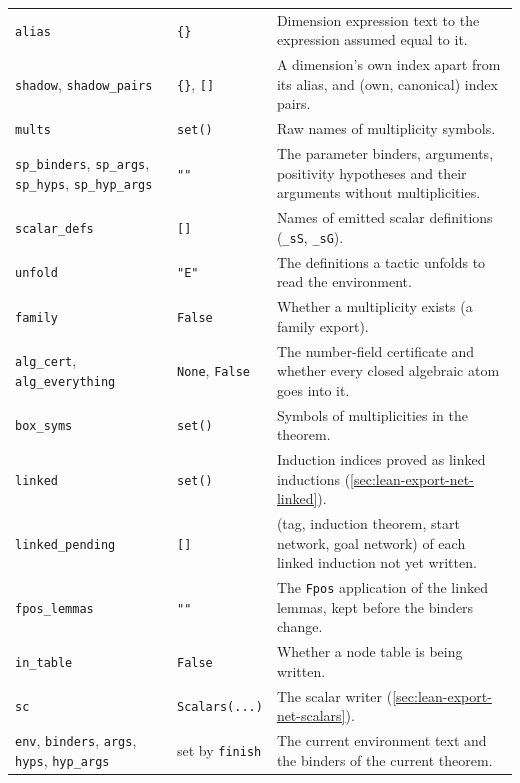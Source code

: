 {\begin{xltabular}{\linewidth}{@{}p{3.3cm}p{3.2cm}X@{}}
\texttt{alias} & \texttt{\{\}} & Dimension expression text to the expression assumed equal to it. \\
\texttt{shadow}, \texttt{shadow\_\allowbreak{}pairs} & \texttt{\{\}}, \texttt{[]} & A dimension's own index apart from its alias,
  and (own, canonical) index pairs. \\
\texttt{mults} & \texttt{set()} & Raw names of multiplicity symbols. \\
\texttt{sp\_\allowbreak{}binders}, \texttt{sp\_\allowbreak{}args}, \texttt{sp\_\allowbreak{}hyps}, \texttt{sp\_\allowbreak{}hyp\_\allowbreak{}args} & \texttt{""} & The parameter binders,
  arguments, positivity hypotheses and their arguments without multiplicities. \\
\texttt{scalar\_\allowbreak{}defs} & \texttt{[]} & Names of emitted scalar definitions (\texttt{\_\allowbreak{}sS}, \texttt{\_\allowbreak{}sG}). \\
\texttt{unfold} & \texttt{"E"} & The definitions a tactic unfolds to read the environment. \\
\texttt{family} & \texttt{False} & Whether a multiplicity exists (a family export). \\
\texttt{alg\_\allowbreak{}cert}, \texttt{alg\_\allowbreak{}everything} & \texttt{None}, \texttt{False} & The number-field certificate and
  whether every closed algebraic atom goes into it. \\
\texttt{box\_\allowbreak{}syms} & \texttt{set()} & Symbols of \bbox{} multiplicities in the theorem. \\
\texttt{linked} & \texttt{set()} & Induction indices proved as linked inductions (\cref{sec:lean-export-net-linked}). \\
\texttt{linked\_\allowbreak{}pending} & \texttt{[]} & (tag, induction theorem, start network, goal network) of each linked induction not yet written. \\
\texttt{fpos\_\allowbreak{}lemmas} & \texttt{""} & The \texttt{Fpos} application of the linked lemmas, kept before the binders change. \\
\texttt{in\_\allowbreak{}table} & \texttt{False} & Whether a node table is being written. \\
\texttt{sc} & \texttt{Scalars(...)} & The scalar writer (\cref{sec:lean-export-net-scalars}). \\
\texttt{env}, \texttt{binders}, \texttt{args}, \texttt{hyps}, \texttt{hyp\_\allowbreak{}args} & set by \texttt{finish} & The current
  environment text and the binders of the current theorem. \\
\bottomrule
\end{xltabular}

}
